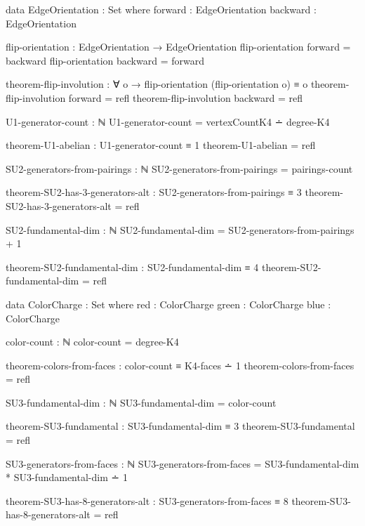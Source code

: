 \documentclass[11pt,a4paper]{book}
\begin{document}
\begin{code}
data EdgeOrientation : Set where
  forward  : EdgeOrientation
  backward : EdgeOrientation

flip-orientation : EdgeOrientation → EdgeOrientation
flip-orientation forward  = backward
flip-orientation backward = forward

theorem-flip-involution : ∀ o → flip-orientation (flip-orientation o) ≡ o
theorem-flip-involution forward  = refl
theorem-flip-involution backward = refl

U1-generator-count : ℕ
U1-generator-count = vertexCountK4 ∸ degree-K4

theorem-U1-abelian : U1-generator-count ≡ 1
theorem-U1-abelian = refl
\end{code}

\begin{code}
SU2-generators-from-pairings : ℕ
SU2-generators-from-pairings = pairings-count

theorem-SU2-has-3-generators-alt : SU2-generators-from-pairings ≡ 3
theorem-SU2-has-3-generators-alt = refl

SU2-fundamental-dim : ℕ
SU2-fundamental-dim = SU2-generators-from-pairings + 1

theorem-SU2-fundamental-dim : SU2-fundamental-dim ≡ 4
theorem-SU2-fundamental-dim = refl
\end{code}

\begin{code}
data ColorCharge : Set where
  red   : ColorCharge
  green : ColorCharge
  blue  : ColorCharge

color-count : ℕ
color-count = degree-K4

theorem-colors-from-faces : color-count ≡ K4-faces ∸ 1
theorem-colors-from-faces = refl

SU3-fundamental-dim : ℕ
SU3-fundamental-dim = color-count

theorem-SU3-fundamental : SU3-fundamental-dim ≡ 3
theorem-SU3-fundamental = refl

SU3-generators-from-faces : ℕ
SU3-generators-from-faces = SU3-fundamental-dim * SU3-fundamental-dim ∸ 1

theorem-SU3-has-8-generators-alt : SU3-generators-from-faces ≡ 8
theorem-SU3-has-8-generators-alt = refl
\end{code}
\end{document}
